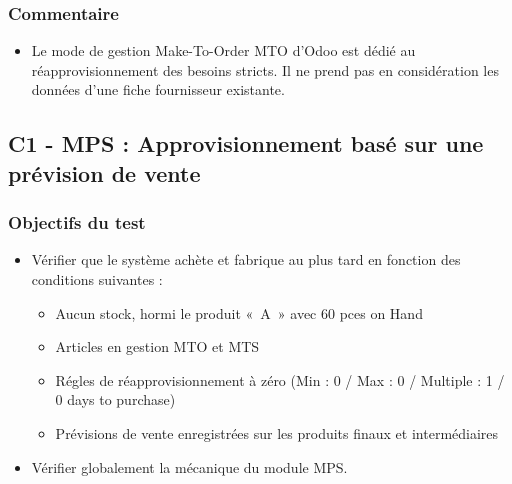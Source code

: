 \documentclass[letterpaper,10pt,french]{sphinxmanual}
\begin{document}
\subsubsection{Commentaire}
\label{\detokenize{readthedocs/tests/A1_MTO_MTS:commentaire}}\begin{itemize}
\item {} 
Le mode de gestion Make-To-Order MTO d’Odoo est dédié au réapprovisionnement des besoins stricts. Il ne prend pas en considération les données d’une fiche fournisseur existante.

\end{itemize}


\subsection{C1 - MPS : Approvisionnement basé sur une prévision de vente}
\label{\detokenize{readthedocs/tests/C1_MPS:c1-mps-approvisionnement-base-sur-une-prevision-de-vente}}\label{\detokenize{readthedocs/tests/C1_MPS::doc}}

\subsubsection{Objectifs du test}
\label{\detokenize{readthedocs/tests/C1_MPS:objectifs-du-test}}\begin{itemize}
\item {} 
Vérifier que le système achète et fabrique au plus tard en fonction des conditions suivantes :
\begin{itemize}
\item {} 
Aucun stock, hormi le produit « A » avec 60 pces on Hand

\item {} 
Articles en gestion MTO et MTS

\item {} 
Régles de réapprovisionnement à zéro (Min : 0 / Max : 0 / Multiple : 1 / 0 days to purchase)

\item {} 
Prévisions de vente enregistrées sur les produits finaux et intermédiaires

\end{itemize}

\item {} 
Vérifier globalement la mécanique du module MPS.

\end{itemize}
\end{document}
